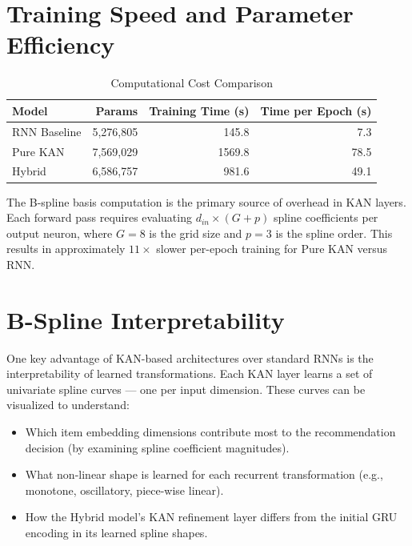 \documentclass[12pt,a4paper]{report}
\begin{document}
\section{Training Speed and Parameter Efficiency}

\begin{table}[H]
\centering
\caption{Computational Cost Comparison}
\begin{tabular}{l r r r}
\toprule
\textbf{Model} & \textbf{Params} & \textbf{Training Time (s)} & \textbf{Time per Epoch (s)} \\
\midrule
RNN Baseline & 5,276,805  &  145.8  &  7.3  \\
Pure KAN     & 7,569,029  & 1569.8  & 78.5  \\
Hybrid       & 6,586,757  &  981.6  & 49.1  \\
\bottomrule
\end{tabular}
\label{tab:compute}
\end{table}

The B-spline basis computation is the primary source of overhead in KAN layers.
Each forward pass requires evaluating $d_{in} \times (G + p)$ spline coefficients
per output neuron, where $G=8$ is the grid size and $p=3$ is the spline order.
This results in approximately $11\times$ slower per-epoch training for Pure KAN
versus RNN.

\section{B-Spline Interpretability}

One key advantage of KAN-based architectures over standard RNNs is the
interpretability of learned transformations. Each KAN layer learns a set of
univariate spline curves --- one per input dimension. These curves can be
visualized to understand:

\begin{itemize}
    \item Which item embedding dimensions contribute most to the recommendation
          decision (by examining spline coefficient magnitudes).
    \item What non-linear shape is learned for each recurrent transformation
          (e.g., monotone, oscillatory, piece-wise linear).
    \item How the Hybrid model's KAN refinement layer differs from the initial
          GRU encoding in its learned spline shapes.
\end{itemize}
\end{document}
